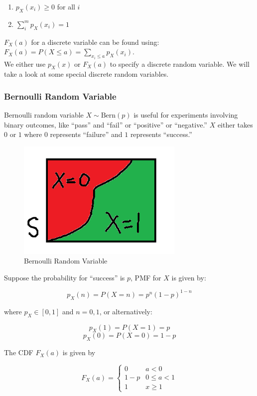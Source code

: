 \documentclass[12pt, a4paper]{article}
\begin{document}
\begin{enumerate}[i]
  \item $p_X (x_i) \ge 0$ for all $i$
  \item $\sum_i^m p_X (x_i)=1$
\end{enumerate}

$F_X(a)$ for a discrete variable can be found using: $F_X(a)=P(X\le a)=\sum_{x_i\le a} p_X(x_i)$. \\

We either use $p_X (x)$ or $F_X (a)$ to specify a discrete random variable. We will take a look at some special discrete random variables.

\subsubsection{Bernoulli Random Variable}

Bernoulli random variable $X \sim \text{Bern} (p)$ is useful for experiments involving binary outcomes, like ``pass'' and ``fail'' or ``positive'' or ``negative.'' $X$ either takes $0$ or $1$ where $0$ represents ``failure'' and $1$ represents ``success.''

\begin{figure}[H]
\centering
\includegraphics[width=80mm]{5.png}
\caption{Bernoulli Random Variable}
\end{figure}

Suppose the probability for ``success'' is $p$, PMF for $X$ is given by:

$$p_X(n)=P(X=n)=p^n(1-p)^{1-n}$$

where $p_X\in[0,1]$ and $n=0,1$, or alternatively:

$$p_X(1)=P(X=1)=p$$
$$p_X(0)=P(X=0)=1-p$$

The CDF $F_X(a)$ is given by

$$
F_X(a)=
\begin{cases} 
0 & a<0 \\
1-p & 0\le a<1 \\
1 & x \ge 1
\end{cases}
$$
\end{document}
